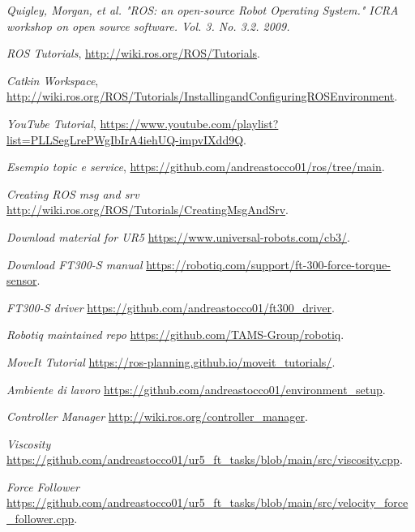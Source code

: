 \begin{thebibliography}{99}

 \textit{Quigley, Morgan, et al. "ROS: an open-source Robot Operating System." ICRA workshop on open source software. 
Vol. 3. No. 3.2. 2009.}

 \textit{ROS Tutorials}, \url{http://wiki.ros.org/ROS/Tutorials}.

 \textit{Catkin Workspace}, \url{http://wiki.ros.org/ROS/Tutorials/InstallingandConfiguringROSEnvironment}.

 \textit{YouTube Tutorial}, \url{https://www.youtube.com/playlist?list=PLLSegLrePWgIbIrA4iehUQ-impvIXdd9Q}.

 \textit{Esempio topic e service}, \url{https://github.com/andreastocco01/ros/tree/main}.

 \textit{Creating ROS msg and srv} \url{http://wiki.ros.org/ROS/Tutorials/CreatingMsgAndSrv}.

 \textit{Download material for UR5} \url{https://www.universal-robots.com/cb3/}.

 \textit{Download FT300-S manual} \url{https://robotiq.com/support/ft-300-force-torque-sensor}.

 \textit{FT300-S driver} \url{https://github.com/andreastocco01/ft300_driver}.

 \textit{Robotiq maintained repo} \url{https://github.com/TAMS-Group/robotiq}.

 \textit{MoveIt Tutorial} \url{https://ros-planning.github.io/moveit_tutorials/}.

 \textit{Ambiente di lavoro} \url{https://github.com/andreastocco01/environment_setup}.

 \textit{Controller Manager} \url{http://wiki.ros.org/controller_manager}.

 \textit{Viscosity} \url{https://github.com/andreastocco01/ur5_ft_tasks/blob/main/src/viscosity.cpp}. 

 \textit{Force Follower} \url{https://github.com/andreastocco01/ur5_ft_tasks/blob/main/src/velocity_force_follower.cpp}.

\end{thebibliography}